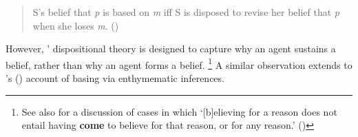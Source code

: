 \begin{note}
  \begin{quote}
    S's belief that \emph{p} is based on \emph{m} iff S is disposed to revise her belief that \emph{p} when she loses \emph{m}.%
    \mbox{}\hfill\mbox{(\citeyear[2952]{Evans:2013tw})}
  \end{quote}

  However, \citeauthor{Evans:2013tw}' dispositional theory is designed to capture why an agent sustains a belief, rather than why an agent forms a belief.%
  \footnote{
    See also \textcite{Audi:1986to} for a discussion of cases in which `[b]elieving for a reason does not entail having \textbf{come} to believe for that reason, or for any reason.' (\citeyear[32--33]{Audi:1986to})
  }
  A similar observation extends to \citeauthor{Moretti:2019wx}'s (\citeyear{Moretti:2019wx}) account of basing via enthymematic inferences.
\end{note}


